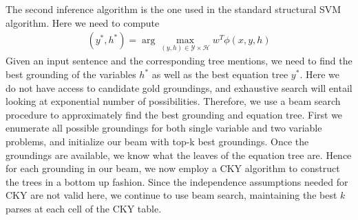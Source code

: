       The second inference algorithm is the one used in the standard
      structural SVM algorithm. Here we need to compute
      \begin{align*}
        (y^*, h^*) = \arg\max_{(y, h) \in \mathcal{Y} \times \mathcal{H}} 
        w^T\phi(x, y, h)
      \end{align*}  
      Given an input sentence and the corresponding tree mentions, we
      need to find the best grounding of the variables $h^*$ as well
      as the best equation tree $y^*$. Here we do not have access to
      candidate gold groundings, and exhaustive search will entail
      looking at exponential number of possibilities. Therefore, we
      use a beam search procedure to approximately find the best
      grounding and equation tree. First we enumerate all possible
      groundings for both single variable and two variable problems,
      and initialize our beam with top-k best groundings. Once the
      groundings are available, we know what the leaves of the
      equation tree are. Hence for each grounding in our beam, we now
      employ a CKY algorithm to construct the trees in a bottom up
      fashion. Since the independence assumptions needed for CKY are
      not valid here, we continue to use beam search, maintaining the
      best $k$ parses at each cell of the CKY table.
      
